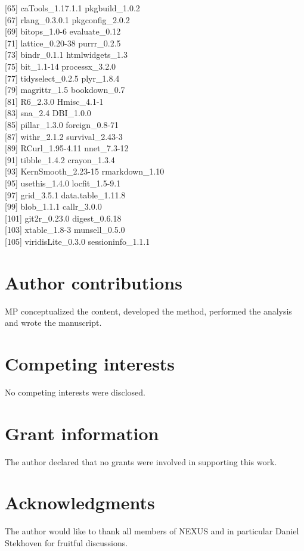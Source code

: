 \documentclass[9pt,a4paper,]{extarticle}
\theoremstyle{definition}
\theoremstyle{definition}
\theoremstyle{definition}
\theoremstyle{remark}
\begin{document}
{[}65{]} caTools\_1.17.1.1 pkgbuild\_1.0.2\\
{[}67{]} rlang\_0.3.0.1 pkgconfig\_2.0.2\\
{[}69{]} bitops\_1.0-6 evaluate\_0.12\\
{[}71{]} lattice\_0.20-38 purrr\_0.2.5\\
{[}73{]} bindr\_0.1.1 htmlwidgets\_1.3\\
{[}75{]} bit\_1.1-14 processx\_3.2.0\\
{[}77{]} tidyselect\_0.2.5 plyr\_1.8.4\\
{[}79{]} magrittr\_1.5 bookdown\_0.7\\
{[}81{]} R6\_2.3.0 Hmisc\_4.1-1\\
{[}83{]} sna\_2.4 DBI\_1.0.0\\
{[}85{]} pillar\_1.3.0 foreign\_0.8-71\\
{[}87{]} withr\_2.1.2 survival\_2.43-3\\
{[}89{]} RCurl\_1.95-4.11 nnet\_7.3-12\\
{[}91{]} tibble\_1.4.2 crayon\_1.3.4\\
{[}93{]} KernSmooth\_2.23-15 rmarkdown\_1.10\\
{[}95{]} usethis\_1.4.0 locfit\_1.5-9.1\\
{[}97{]} grid\_3.5.1 data.table\_1.11.8\\
{[}99{]} blob\_1.1.1 callr\_3.0.0\\
{[}101{]} git2r\_0.23.0 digest\_0.6.18\\
{[}103{]} xtable\_1.8-3 munsell\_0.5.0\\
{[}105{]} viridisLite\_0.3.0 sessioninfo\_1.1.1

\section{Author contributions}\label{author-contributions}

MP conceptualized the content, developed the method, performed the analysis and wrote the manuscript.

\section{Competing interests}\label{competing-interests}

No competing interests were disclosed.

\section{Grant information}\label{grant-information}

The author declared that no grants were involved in supporting this work.

\section{Acknowledgments}\label{acknowledgments}

The author would like to thank all members of NEXUS and in particular Daniel Stekhoven for fruitful discussions.

{\small}
\end{document}
